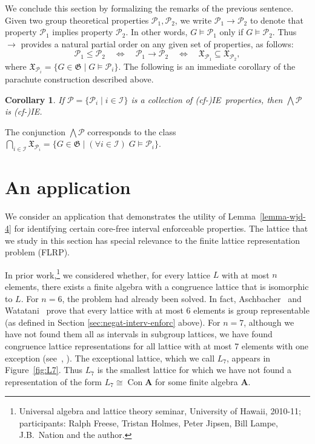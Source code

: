 \documentclass[11pt]{amsart}
\theoremstyle{plain}
\newtheorem{corollary}[theorem]{Corollary}
\theoremstyle{definition}
\theoremstyle{remark}
\numberwithin{theorem}{section}
\numberwithin{claim}{section}
\numberwithin{equation}{section}
\numberwithin{conjecture}{section}
\newcommand{\<}{\ensuremath{\langle}}
\renewcommand{\>}{\ensuremath{\rangle}}
\renewcommand{\leq}{\ensuremath{\leqslant}}
\newcommand{\Meet}{\ensuremath{\bigwedge}}
\newcommand{\Con}{\ensuremath{\operatorname{Con}}}
\newcommand{\FLRP}{{\small FLRP}}
\newcommand{\0}{\ensuremath{\mathbf{0}}}
\newcommand{\1}{\ensuremath{\mathbf{1}}}
\newcommand{\2}{\ensuremath{\mathbf{2}}}
\newcommand{\3}{\ensuremath{\mathbf{3}}}
\newcommand{\4}{\ensuremath{\mathbf{4}}}
\newcommand{\5}{\ensuremath{\mathbf{5}}}
\newcommand{\bA}{\ensuremath{\mathbf{A}}}
\newcommand{\sG}{\ensuremath{\mathfrak{X}}}
\newcommand{\G}{\ensuremath{\mathfrak{G}}}
\newcommand{\sI}{\ensuremath{\mathscr{I}}}
\newcommand{\sP}{\ensuremath{\mathscr{P}}}
\newcommand{\cP}{\ensuremath{\mathcal{P}}}
\newcommand{\IE}{{\small IE}}
\begin{document}
We conclude this section by formalizing the remarks of the previous sentence.
Given two group theoretical properties $\cP_1, \cP_2$, we write
$\cP_1 \rightarrow \cP_2$ to denote that property 
$\cP_1$ implies property $\cP_2$. In other words,
$G\vDash \cP_1$ only if $G\vDash \cP_2$.
Thus $\rightarrow$ provides a natural partial order on any given set of 
properties, as follows:
\[
\cP_1 \leq \cP_2\quad  \Longleftrightarrow \quad \cP_1 \rightarrow \cP_2 \quad
\Longleftrightarrow \quad \sG_{\cP_1}\subseteq
\sG_{\cP_2},
\]
where $\sG_{\cP_i} = \{G\in \G \mid G\vDash \cP_i\}$.
The following is an immediate corollary of the parachute construction
described above.
\begin{corollary}
\label{cor:isle-prop-groups-1}
  If $\sP = \{\cP_i \mid i\in \sI\}$ is a collection of (cf-)\IE\ properties,
  then $\Meet \sP$ is (cf-)\IE.
\end{corollary}
The conjunction $\Meet \sP$ corresponds to the class 
$\bigcap_{i\in \sI} \sG_{\cP_i} = \{G \in \G \mid (\forall i \in \sI) \; G\vDash
\cP_i \}$.

\section{An application}
\label{sec:application}
We consider an application that 
demonstrates the utility of Lemma~\ref{lemma-wjd-4} for identifying certain core-free
interval enforceable properties.
The lattice that we study in this section 
has special relevance to the finite lattice representation problem (\FLRP).

In prior 
work,\footnote{Universal algebra and lattice theory seminar, University of
  Hawaii, 2010-11; participants: Ralph Freese, Tristan
  Holmes, Peter Jipsen, Bill Lampe, J.B.~Nation and the author.}
 we considered whether, for every
lattice $L$ with at most $n$ elements, there exists a finite algebra with a
congruence lattice that is isomorphic to $L$.
For $n=6$, the problem had already been solved.
In fact, Aschbacher~\cite{Aschbacher:2008} and Watatani~\cite{Watatani:1996}
prove that every lattice with at most 6 elements is group representable
(as defined in Section \ref{sec:negat-interv-enforc} above).  
For $n=7$, although we have not found them all as intervals in subgroup lattices, we have
found congruence lattice representations for all lattice with at most 7 elements
with one exception (see~\cite{overalgebras}, \cite{DeMeo:thesis}). 
The exceptional lattice, which we call $L_7$, appears in
Figure~\ref{fig:L7}. Thus $L_7$ is the smallest lattice for which we have not
found a representation of the form $L_7\cong \Con\bA$ for some finite algebra
$\bA$.
\end{document}
